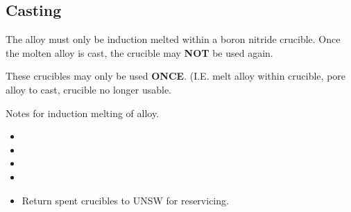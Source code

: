 \subsection{Casting}

The \MgZnCa alloy must only be induction melted within a boron nitride crucible. Once the molten alloy is cast, the crucible may \textbf{NOT} be used again. 

These crucibles may only be used \textbf{ONCE}. (I.E. melt alloy within crucible, pore alloy to cast, crucible no longer usable. 

Notes for induction melting of \MgZnCa alloy.
\begin{itemize}
\item 
\item 
\item 
\item
\item Return spent crucibles to UNSW for reservicing. 
\end{itemize}